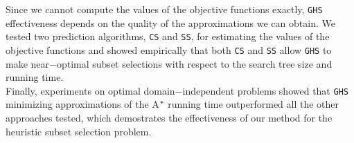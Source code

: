 Since we cannot compute the values of the objective functions exactly, \texttt{GHS} effectiveness depends on the quality of the approximations we can obtain. We tested two prediction algorithms, \texttt{CS} and \texttt{SS}, for estimating the values of the objective functions and showed empirically that both \texttt{CS} and \texttt{SS} allow \texttt{GHS} to make near$-$optimal subset selections with respect to the search tree size and running time.\\

Finally, experiments on optimal domain$-$independent problems showed that \texttt{GHS} minimizing approximations of the A$\sp{*}$ running time outperformed all the other approaches tested, which demostrates the effectiveness of our method for the heuristic subset selection problem.

\clearpage